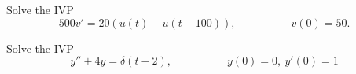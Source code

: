 \begin{applicationActivities}
\begin{activity}{15}
Solve the IVP
\[ 500v' = 20 \left( u(t)-u(t-100)\right), \hspace{5em} v(0)=50.\]
\end{activity}

\begin{activity}{15}
Solve the IVP
\[y''+4y=\delta(t-2), \hspace{5em} y(0)=0,\ y'(0)=1\]
\end{activity}



\end{applicationActivities}

